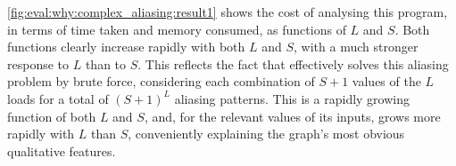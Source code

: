 \autoref{fig:eval:why:complex_aliasing:result1} shows the cost of
analysing this program, in terms of time taken and memory consumed, as
functions of $L$ and $S$.  Both functions clearly increase rapidly
with both $L$ and $S$, with a much stronger response to $L$ than to
$S$.  This reflects the fact that {\implementation} effectively solves this
aliasing problem by brute force, considering each combination of $S+1$
values of the $L$ loads for a total of $(S+1)^L$ aliasing patterns.
This is a rapidly growing function of both $L$ and $S$, and, for the
relevant values of its inputs, grows more rapidly with $L$ than $S$,
conveniently explaining the graph's most obvious qualitative
features.\kern-1pt

